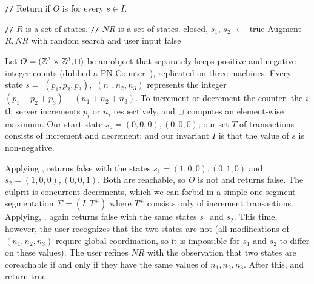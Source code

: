 \newcommand{\algocomment}[1]{\State \textcolor{flatdenim}{\texttt{//} #1}}
\begin{algorithm}[t]
  \caption{%
    Interactive \invariantconfluence{} decision procedure for arbitrary start
    state $s \in I$
  }%
  \begin{algorithmic}
    \algocomment{Return if $O$ is  for every $s \in I$.}
      \State \Return {}
    \EndFunction

    \State

    \algocomment{$R$ is a set of \TIcoreachable{} states.}
    \algocomment{$NR$ is a set of \TIcounreachable{} states.}
      \State closed, $s_1$, $s_2$ $\gets$ 
        \Return true
      \EndIf
      \State Augment $R, NR$ with random search and user input
        \Return false
      \EndIf
      \State \Return {}
    \EndFunction
  \end{algorithmic}
\end{algorithm}

\begin{example}
  Let $O = (\mathbb{Z}^3 \times \mathbb{Z}^3, \sqcup)$ be an object that separately keeps positive and negative integer counts (dubbed a
  PN-Counter~\cite{shapiro2011comprehensive}), replicated on three machines.
  Every state $s = $ $(p_1, p_2, p_3),$ $(n_1, n_2, n_3)$ represents the
  integer $(p_1 + p_2 + p_3) - (n_1 + n_2 + n_3)$. To increment or decrement
  the counter, the $i$th server increments $p_i$ or $n_i$ respectively, and
  $\sqcup$ computes an element-wise maximum. Our start state $s_0 = (0, 0, 0),
  (0, 0, 0)$; our set $T$ of transactions consists of increment and decrement;
  and our invariant $I$ is that the value of $s$ is non-negative.

  Applying , \IsIclosed{} returns false
  with the states $s_1 = (1, 0, 0), (0, 1, 0)$ and $s_2 = (1, 0, 0), (0, 0,
  1)$. Both are reachable, so $O$ is not \sTIconfluent{} and
   returns false.  The culprit is
  concurrent decrements, which we can forbid in a simple one-segment
  segmentation $\Sigma = (I, T^+)$ where $T^+$ consists only of increment
  transactions. Applying, ,
  \IsIclosed{} again returns false with the same states $s_1$ and $s_2$. This time,
  however, the user recognizes that the two states are not
   (all modifications of $(n_1, n_2, n_3)$ require global
  coordination, so it is impossible for $s_1$ and $s_2$ to differ on these
  values).
  The user refines $NR$ with the observation that two
  states are coreachable if and only if they have the same values of $n_1, n_2,
  n_3$. After this, \IsIclosed{} and
   return true.
\end{example}

